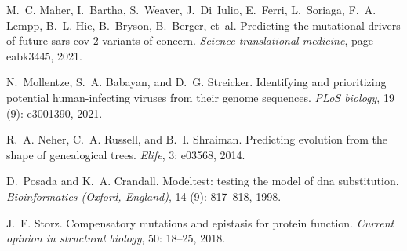 \documentclass[onecolumn, compsoc,12pt]{IEEEtran}
\begin{document}
\begin{thebibliography}{11}
M.~C. Maher, I.~Bartha, S.~Weaver, J.~Di~Iulio, E.~Ferri, L.~Soriaga, F.~A.
  Lempp, B.~L. Hie, B.~Bryson, B.~Berger, et~al.
\newblock Predicting the mutational drivers of future sars-cov-2 variants of
  concern.
\newblock \emph{Science translational medicine}, page eabk3445, 2021.

N.~Mollentze, S.~A. Babayan, and D.~G. Streicker.
\newblock Identifying and prioritizing potential human-infecting viruses from
  their genome sequences.
\newblock \emph{PLoS biology}, 19 (9): e3001390, 2021.

R.~A. Neher, C.~A. Russell, and B.~I. Shraiman.
\newblock Predicting evolution from the shape of genealogical trees.
\newblock \emph{Elife}, 3: e03568, 2014.

D.~Posada and K.~A. Crandall.
\newblock Modeltest: testing the model of dna substitution.
\newblock \emph{Bioinformatics (Oxford, England)}, 14 (9):
  817--818, 1998.

J.~F. Storz.
\newblock Compensatory mutations and epistasis for protein function.
\newblock \emph{Current opinion in structural biology}, 50: 18--25,
  2018.

\end{thebibliography}
\end{document}
